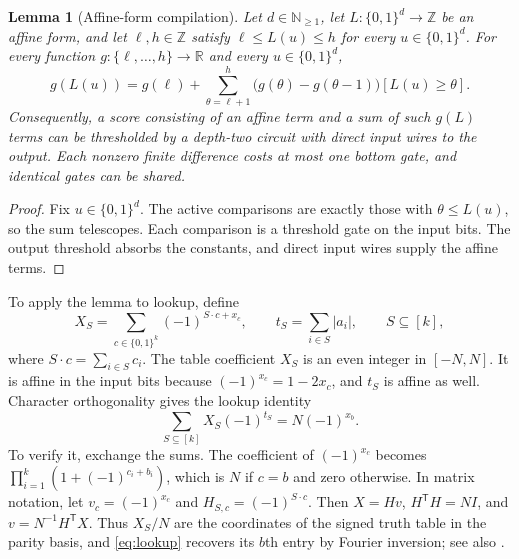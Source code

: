 \documentclass[11pt]{article}
\newtheorem{lemma}[theorem]{Lemma}
\newcommand{\bits}{\{0,1\}}
\begin{document}
\begin{lemma}[Affine-form compilation]\label{lem:ladder}
Let $d\in\mathbb N_{\ge1}$, let $L:\bits^d\to\mathbb Z$ be an affine
form, and let $\ell,h\in\mathbb Z$ satisfy $\ell\le L(u)\le h$ for every
$u\in\bits^d$. For every function $g:\{\ell,\ldots,h\}\to\mathbb R$
and every $u\in\bits^d$,
$$
g(L(u))=g(\ell)+\sum_{\theta=\ell+1}^{h}
\bigl(g(\theta)-g(\theta-1)\bigr)[L(u)\ge\theta].
$$
Consequently, a score consisting of an affine term and a sum of such
$g(L)$ terms can be thresholded by a depth-two circuit with direct input
wires to the output. Each nonzero finite difference costs at most one
bottom gate, and identical gates can be shared.
\end{lemma}
\begin{proof}
Fix $u\in\bits^d$. The active comparisons are exactly those with
$\theta\le L(u)$, so the
sum telescopes. Each comparison is a threshold gate on the input bits.
The output threshold absorbs the constants, and direct input wires
supply the affine terms.
\end{proof}

To apply the lemma to lookup, define
$$
X_S=\sum_{c\in\bits^k}(-1)^{S\cdot c+x_c},\qquad
t_S=\sum_{i\in S}|a_i|,\qquad S\subseteq[k],
$$
where $S\cdot c=\sum_{i\in S}c_i$. The table coefficient $X_S$ is an
even integer in $[-N,N]$. It is affine in the input bits because
$(-1)^{x_c}=1-2x_c$, and $t_S$ is affine as well. Character orthogonality
gives the lookup identity
\begin{equation}\label{eq:lookup}
\sum_{S\subseteq[k]}X_S(-1)^{t_S}=N(-1)^{x_b}.
\end{equation}
To verify it, exchange the sums. The coefficient of $(-1)^{x_c}$ becomes
$\prod_{i=1}^k(1+(-1)^{c_i+b_i})$, which is $N$ if $c=b$ and zero
otherwise. In matrix notation, let $v_c=(-1)^{x_c}$ and
$H_{S,c}=(-1)^{S\cdot c}$. Then $X=Hv$, $H^{\mathsf T}H=NI$, and
$v=N^{-1}H^{\mathsf T}X$. Thus $X_S/N$ are the coordinates of the signed
truth table in the parity basis, and \eqref{eq:lookup} recovers its $b$th
entry by Fourier inversion; see also \cite[Chapter~1]{OD}.
\end{document}
